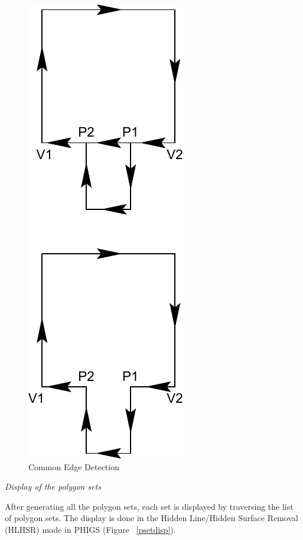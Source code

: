 \begin{enumerate}
        \begin{figure}[htbp]
	\hspace{2cm}
	\includegraphics{IYAD41.pdf}
            \caption{Common Edge Detection}
            \label{iyad41}
        \end{figure}


	{\em Display of the polygon sets }

		After generating all the polygon sets, each set is displayed by 
		traversing the list of polygon sets. The display 
		is done in the Hidden Line/Hidden Surface Removal (HLHSR)
		mode in PHIGS (Figure ~\ref{psetdisp}).


\end{enumerate}
